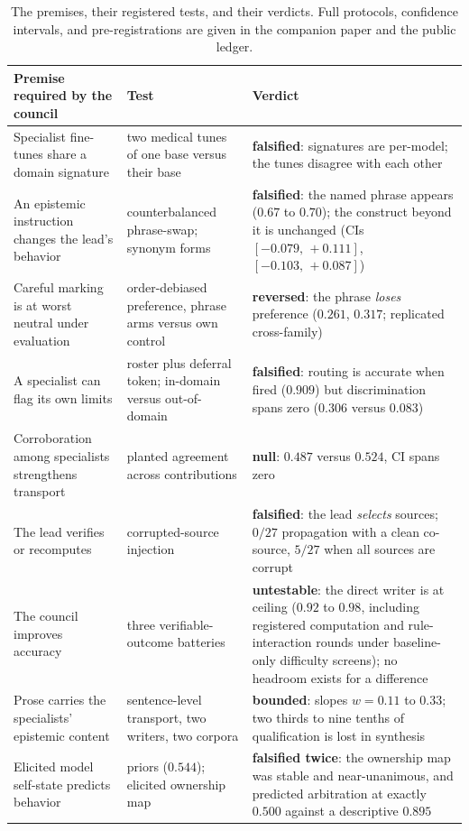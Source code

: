 \documentclass[11pt]{article}
\newcommand{\ci}[2]{\ensuremath{[#1,\,#2]}}
\begin{document}
\begin{table}[t]
\centering\small
\begin{tabular}{p{}p{}p{}}
\toprule
Premise required by the council & Test & Verdict \\
\midrule
Specialist fine-tunes share a domain signature & two medical tunes of
one base versus their base & \textbf{falsified}: signatures are
per-model; the tunes disagree with each other \\
An epistemic instruction changes the lead's behavior & counterbalanced
phrase-swap; synonym forms & \textbf{falsified}: the named phrase
appears ($0.67$ to $0.70$); the construct beyond it is unchanged
(CIs \ci{-0.079}{+0.111}, \ci{-0.103}{+0.087}) \\
Careful marking is at worst neutral under evaluation & order-debiased
preference, phrase arms versus own control & \textbf{reversed}: the
phrase \emph{loses} preference ($0.261$, $0.317$; replicated
cross-family) \\
A specialist can flag its own limits & roster plus deferral token;
in-domain versus out-of-domain & \textbf{falsified}: routing is accurate
when fired ($0.909$) but discrimination spans zero ($0.306$ versus
$0.083$) \\
Corroboration among specialists strengthens transport & planted
agreement across contributions & \textbf{null}: $0.487$ versus
$0.524$, CI spans zero \\
The lead verifies or recomputes & corrupted-source injection &
\textbf{falsified}: the lead \emph{selects} sources; $0/27$ propagation
with a clean co-source, $5/27$ when all sources are corrupt \\
The council improves accuracy & three verifiable-outcome batteries &
\textbf{untestable}: the direct writer is at ceiling ($0.92$ to $0.98$,
including registered computation and rule-interaction rounds under
baseline-only difficulty screens); no headroom exists for a difference \\
Prose carries the specialists' epistemic content & sentence-level
transport, two writers, two corpora & \textbf{bounded}: slopes
$w=0.11$ to $0.33$; two thirds to nine tenths of qualification is lost
in synthesis \\
Elicited model self-state predicts behavior & priors ($0.544$);
elicited ownership map & \textbf{falsified twice}: the ownership map
was stable and near-unanimous, and predicted arbitration at exactly
$0.500$ against a descriptive $0.895$ \\
\bottomrule
\end{tabular}
\caption{The premises, their registered tests, and their verdicts. Full
protocols, confidence intervals, and pre-registrations are given in the
companion paper and the public ledger.}
\label{tab:premises}
\end{table}
\end{document}
